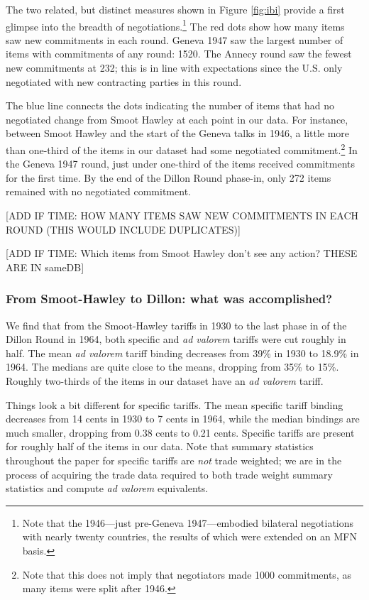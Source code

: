 \documentclass[
  12pt,
]{article}
\begin{document}
The two related, but distinct measures shown in Figure \ref{fig:ibi} provide a first glimpse into the breadth of negotiations.\footnote{Note that the 1946---just pre-Geneva 1947---embodied bilateral negotiations with nearly twenty countries, the results of which were extended on an MFN basis.} The red dots show how many items saw new commitments in each round. Geneva 1947 saw the largest number of items with commitments of any round: 1520. The Annecy round saw the fewest new commitments at 232; this is in line with expectations since the U.S. only negotiated with new contracting parties in this round.

The blue line connects the dots indicating the number of items that had no negotiated change from Smoot Hawley at each point in our data. For instance, between Smoot Hawley and the start of the Geneva talks in 1946, a little more than one-third of the items in our dataset had some negotiated commitment.\footnote{Note that this does not imply that negotiators made 1000 commitments, as many items were split after 1946.} In the Geneva 1947 round, just under one-third of the items received commitments for the first time. By the end of the Dillon Round phase-in, only 272 items remained with no negotiated commitment.

{[}ADD IF TIME: HOW MANY ITEMS SAW NEW COMMITMENTS IN EACH ROUND (THIS WOULD INCLUDE DUPLICATES){]}

{[}ADD IF TIME: Which items from Smoot Hawley don't see any action? THESE ARE IN sameDB{]}

\hypertarget{from-smoot-hawley-to-dillon-what-was-accomplished}{%
\subsubsection{From Smoot-Hawley to Dillon: what was accomplished?}\label{from-smoot-hawley-to-dillon-what-was-accomplished}}

We find that from the Smoot-Hawley tariffs in 1930 to the last phase in of the Dillon Round in 1964, both specific and \emph{ad valorem} tariffs were cut roughly in half. The mean \emph{ad valorem} tariff binding decreases from 39\% in 1930 to 18.9\% in 1964. The medians are quite close to the means, dropping from 35\% to 15\%. Roughly two-thirds of the items in our dataset have an \emph{ad valorem} tariff.

Things look a bit different for specific tariffs. The mean specific tariff binding decreases from 14 cents in 1930 to 7 cents in 1964, while the median bindings are much smaller, dropping from 0.38 cents to 0.21 cents. Specific tariffs are present for roughly half of the items in our data. Note that summary statistics throughout the paper for specific tariffs are \emph{not} trade weighted; we are in the process of acquiring the trade data required to both trade weight summary statistics and compute \emph{ad valorem} equivalents.
\end{document}
